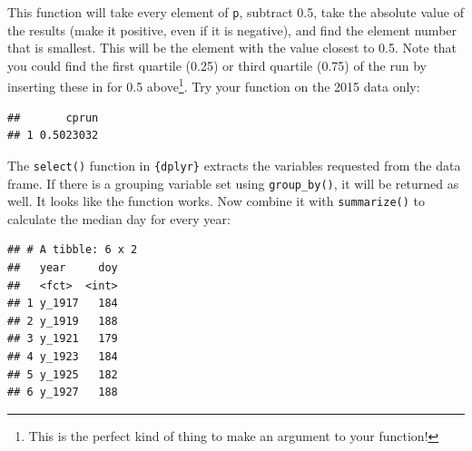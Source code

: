 \documentclass[]{book}
\newenvironment{Shaded}{\begin{snugshade}}{\end{snugshade}}
\newcommand{\KeywordTok}[1]{\textcolor[rgb]{0.13,0.29,0.53}{\textbf{#1}}}
\newcommand{\DataTypeTok}[1]{\textcolor[rgb]{0.13,0.29,0.53}{#1}}
\newcommand{\StringTok}[1]{\textcolor[rgb]{0.31,0.60,0.02}{#1}}
\newcommand{\CommentTok}[1]{\textcolor[rgb]{0.56,0.35,0.01}{\textit{#1}}}
\newcommand{\OperatorTok}[1]{\textcolor[rgb]{0.81,0.36,0.00}{\textbf{#1}}}
\newcommand{\NormalTok}[1]{#1}
\let\rmarkdownfootnote\footnote%
\def\footnote{\protect\rmarkdownfootnote}
\theoremstyle{definition}
\theoremstyle{definition}
\theoremstyle{definition}
\theoremstyle{remark}
\begin{document}
This function will take every element of \texttt{p}, subtract 0.5, take
the absolute value of the results (make it positive, even if it is
negative), and find the element number that is smallest. This will be
the element with the value closest to 0.5. Note that you could find the
first quartile (0.25) or third quartile (0.75) of the run by inserting
these in for 0.5 above\footnote{This is the perfect kind of thing to
  make an argument to your function!}. Try your function on the 2015
data only:

\begin{Shaded}
\end{Shaded}

\begin{verbatim}
##       cprun
## 1 0.5023032
\end{verbatim}

The \texttt{select()} function in \texttt{\{dplyr\}} extracts the
variables requested from the data frame. If there is a grouping variable
set using \texttt{group\_by()}, it will be returned as well. It looks
like the function works. Now combine it with \texttt{summarize()} to
calculate the median day for every year:

\begin{Shaded}
\end{Shaded}

\begin{verbatim}
## # A tibble: 6 x 2
##   year     doy
##   <fct>  <int>
## 1 y_1917   184
## 2 y_1919   188
## 3 y_1921   179
## 4 y_1923   184
## 5 y_1925   182
## 6 y_1927   188
\end{verbatim}
\end{document}
